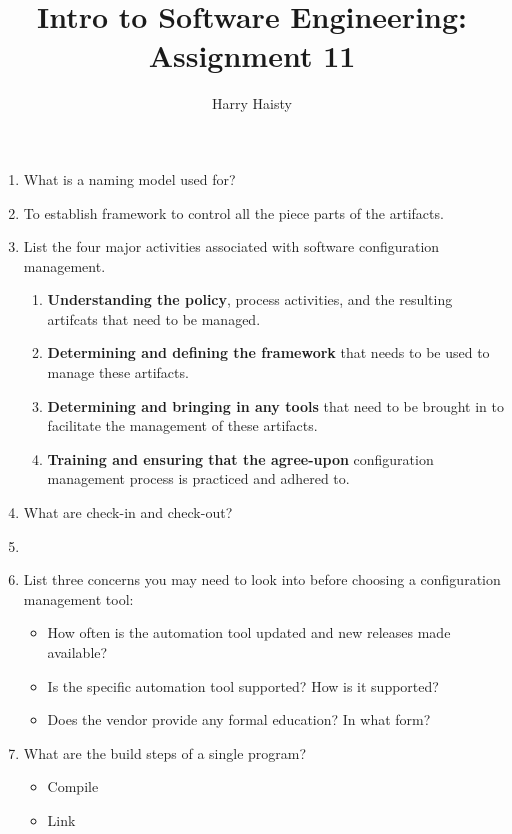 \documentclass[11pt]{article}
\title{Intro to Software Engineering: Assignment 11}
\author{Harry Haisty}
\begin{document}
    \maketitle
    \begin{enumerate}
    
    \item What is a naming model used for?
    \item[] To establish framework to control all the piece parts of the artifacts. 

    
    \item List the four major activities associated with software configuration management.
    \begin{enumerate}
        \item \textbf{Understanding the policy}, process activities, and the resulting artifcats that need to be managed.
        \item \textbf{Determining and defining the framework} that needs to be used to manage these artifacts.
        \item \textbf{Determining and bringing in any tools} that need to be brought in to facilitate the management of these artifacts. 
        \item \textbf{Training and ensuring that the agree-upon} configuration management process is practiced and adhered to.
    \end{enumerate}
    
    \item What are check-in and check-out?
    \item[]
    
    \item List three concerns you may need to look into before choosing a configuration management tool:
    \begin{itemize}
        \item How often is the automation tool updated and new releases made available?
        \item Is the specific automation tool supported? How is it supported?
        \item Does the vendor provide any formal education? In what form?
    \end{itemize}
    
    \item What are the build steps of a single program?
    \begin{itemize}
        \item Compile
        \item Link
    \end{itemize}
    

\end{enumerate}
\end{document}
